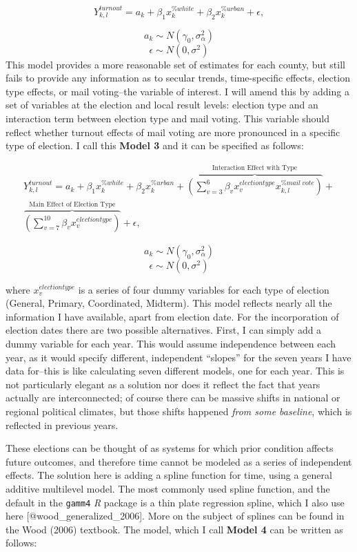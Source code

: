 \documentclass[]{article}
\begin{document}
\begin{equation} \tag{Model 2}
Y^{turnout}_{k,l} = a_{k} + \beta_{1}x_k^{\%white} + \beta_{2}x_k^{\%urban} + \epsilon,
\end{equation}

\[a_{k} \sim N (\gamma_0, \sigma_{\alpha}^2)\]
\[\epsilon \sim N(0, \sigma^2)\] This model provides a more reasonable
set of estimates for each county, but still fails to provide any
information as to secular trends, time-specific effects, election type
effects, or mail voting--the variable of interest. I will amend this by
adding a set of variables at the election and local result levels:
election type and an interaction term between election type and mail
voting. This variable should reflect whether turnout effects of mail
voting are more pronounced in a specific type of election. I call this
\textbf{Model 3} and it can be specified as follows:

\begin{multline} \tag{Model 3}
Y^{turnout}_{k,l} = a_{k} + \beta_{1}x_k^{\% white} + \beta_{2}x_k^{\% urban} + \overbrace{(\sum_{v=3}^{6}\beta_{v}x_{v}^{election type} x_{k,l}^{\% mail~vote})}^\text{Interaction Effect with Type} + \\ \overbrace{(\sum_{v=7}^{10}\beta_{v}x_{v}^{election type})}^\text{Main Effect of Election Type} + \epsilon,
\end{multline}

\[a_{k} \sim N(\gamma_0, \sigma_{\alpha}^2)\]
\[\epsilon \sim N(0, \sigma^2)\]

where \(x_{v}^{election type}\) is a series of four dummy variables for
each type of election (General, Primary, Coordinated, Midterm). This
model reflects nearly all the information I have available, apart from
election date. For the incorporation of election dates there are two
possible alternatives. First, I can simply add a dummy variable for each
year. This would assume independence between each year, as it would
specify different, independent ``slopes'' for the seven years I have
data for--this is like calculating seven different models, one for each
year. This is not particularly elegant as a solution nor does it reflect
the fact that years actually are interconnected; of course there can be
massive shifts in national or regional political climates, but those
shifts happened \emph{from some baseline}, which is reflected in
previous years.

These elections can be thought of as systems for which prior condition
affects future outcomes, and therefore time cannot be modeled as a
series of independent effects. The solution here is adding a spline
function for time, using a general additive multilevel model. The most
commonly used spline function, and the default in the \texttt{gamm4}
\textit{R} package is a thin plate regression spline, which I also use
here {[}@wood\_generalized\_2006{]}. More on the subject of splines can
be found in the Wood (2006) textbook. The model, which I call
\textbf{Model 4} can be written as follows:
\end{document}
